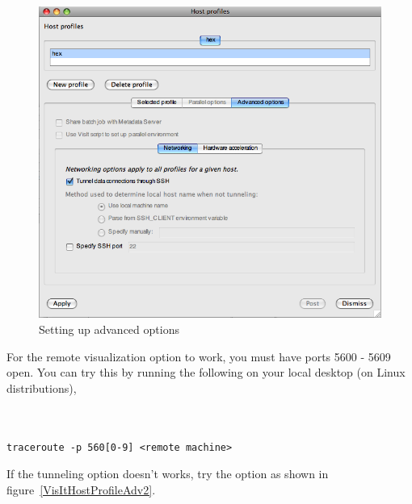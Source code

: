 \documentclass[12pt]{article}
\begin{document}
\begin{figure}

  \center 
  \includegraphics[scale=0.20]{VisItHostProfileAdv.png}
  \caption{Setting up advanced options}
  \label{VisItHostProfileAdv}

\end{figure}

For the remote visualization option to work, you must have ports 5600
- 5609 open. You can try this by running the following on your local
desktop (on Linux distributions),

\begin{verbatim}


traceroute -p 560[0-9] <remote machine>
\end{verbatim}

If the tunneling option doesn't works, try the option as shown in
figure~\ref{VisItHostProfileAdv2}.
\end{document}
